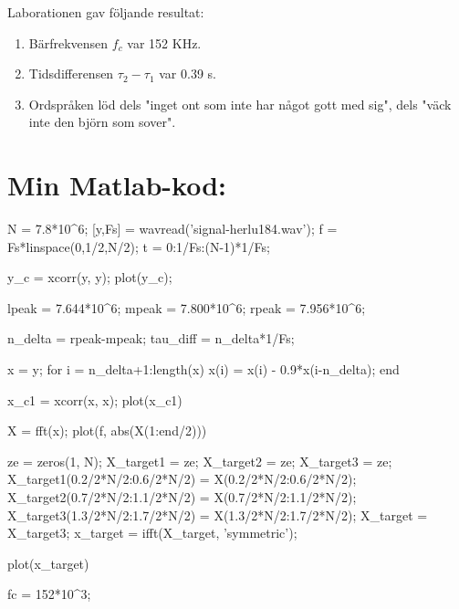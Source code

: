 \documentclass[10pt,twocolumn,a4paper]{article}
\begin{document}
Laborationen gav följande resultat:
\begin{enumerate}
\item Bärfrekvensen $f_c$ var 152 KHz. 
\item Tidsdifferensen $\tau_2 - \tau_1$ var 0.39 s.
\item Ordspråken löd dels "inget ont som inte har något gott med sig", dels "väck inte den björn som sover".
\end{enumerate}

\clearpage

\section*{Min Matlab-kod:}
\begin{spverbatim}
N = 7.8*10^6;
[y,Fs] = wavread('signal-herlu184.wav');
f = Fs*linspace(0,1/2,N/2);
t = 0:1/Fs:(N-1)*1/Fs;

% 
y_c = xcorr(y, y);
plot(y_c);

lpeak = 7.644*10^6;
mpeak = 7.800*10^6;
rpeak = 7.956*10^6;

n_delta = rpeak-mpeak;
tau_diff = n_delta*1/Fs;

%
x = y;
for i = n_delta+1:length(x)
    x(i) = x(i) - 0.9*x(i-n_delta);
end

x_c1 = xcorr(x, x);
plot(x_c1)

X = fft(x);
plot(f, abs(X(1:end/2)))

ze = zeros(1, N);
X_target1 = ze;
X_target2 = ze;
X_target3 = ze;
X_target1(0.2/2*N/2:0.6/2*N/2) = X(0.2/2*N/2:0.6/2*N/2);
X_target2(0.7/2*N/2:1.1/2*N/2) = X(0.7/2*N/2:1.1/2*N/2);
X_target3(1.3/2*N/2:1.7/2*N/2) = X(1.3/2*N/2:1.7/2*N/2);
X_target = X_target3;
x_target = ifft(X_target, 'symmetric');

plot(x_target)

fc = 152*10^3;


\end{spverbatim}
\end{document}
